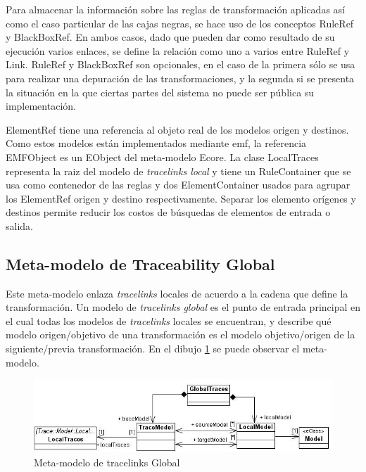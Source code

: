 \documentclass[a4paper,12pt,twoside,spanish,openright]{book}
\begin{document}
Para almacenar la información sobre las reglas de transformación aplicadas así como el caso particular de las cajas negras, se hace uso de los conceptos \textsf{RuleRef} y \textsf{BlackBoxRef}. En ambos casos, dado que pueden dar como resultado de su ejecución varios enlaces, se define la relación como uno a varios entre \textsf{RuleRef} y \textsf{Link}. \textsf{RuleRef} y \textsf{BlackBoxRef} son opcionales, en el caso de la primera sólo se usa para realizar una depuración de las transformaciones, y la segunda si se presenta la situación en la que ciertas partes del sistema no puede ser pública su implementación.

\textsf{ElementRef} tiene una referencia al objeto real de los modelos origen y destinos. Como estos modelos están implementados mediante \gls{emf}, la referencia \textsf{EMFObject} es un \textsf{EObject} del meta-modelo \textsf{Ecore}. La clase \textsf{LocalTraces} representa la raiz del modelo de \textit{tracelinks local} y tiene un \textsf{RuleContainer} que se usa como contenedor de las reglas y dos \textsf{ElementContainer} usados para agrupar los \textsf{ElementRef} origen y destino respectivamente. Separar los elemento orígenes y destinos permite reducir los costos de búsquedas de elementos de entrada o salida.

\subsection{Meta-modelo de Traceability Global}
\label{subsec:TraceabilityGlobal}

Este meta-modelo enlaza \textit{tracelinks} locales de acuerdo a la cadena que define la transformación. Un modelo de \textit{tracelinks global} es el punto de entrada principal en el cual todas los modelos de \textit{tracelinks} locales se encuentran, y describe qué modelo origen/objetivo de una transformación es el modelo objetivo/origen de la siguiente/previa transformación. En el dibujo \ref{fig:GlobalTraceMetamodel} se puede observar el meta-modelo.

\begin{figure}[hbtp]
\centering
\includegraphics[scale=.62]{./img/GlobalTraceMetamodel}
\caption{Meta-modelo de tracelinks Global}
\label{fig:GlobalTraceMetamodel}
\end{figure}
\end{document}
